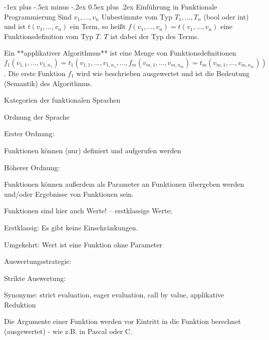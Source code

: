 \documentclass[10pt]{article}
\makeatletter
\renewcommand{\section}{\@startsection{section}{1}{0mm}%
                                {-1ex plus -.5ex minus -.2ex}%
                                {0.5ex plus .2ex}%
                                {\normalfont\large\bfseries}}
\makeatother
\begin{document}
\begin{itemize*}
\section{Einführung in Funktionale Programmierung}
Sind $v_1, ..., v_n$ Unbestimmte vom Typ $T_1, ..., T_n$ (bool oder int) und ist $t(v_1,...,v_n)$ ein Term, so heißt $f(v_1,...,v_n)= t(v_1,...,v_n)$ eine Funktionsdefinition vom Typ $T$. $T$ ist dabei der Typ des Terms.

Ein **applikativer Algorithmus** ist eine Menge von Funktionsdefinitionen $f_1(v_{1,1}, ..., v_{1,n_1}) = t_1(v_{1,1},...,v_{1,n_1},..., f_m(v_{m,1},...,v_{m,n_m}) = t_m(v_{m,1},..., v_{m,n_m}))$. Die erste Funktion $f_1$ wird wie beschrieben ausgewertet und ist die Bedeutung (Semantik) des Algorithmus.

Kategorien der funktionalen Sprachen
\begin{itemize*}
  \item Ordnung der Sprache
  \begin{itemize*}
    \item Erster Ordnung:
    \begin{itemize*}
      \item Funktionen können (nur) definiert und aufgerufen werden
    \end{itemize*}
    \item Höherer Ordnung:
    \begin{itemize*}
      \item Funktionen können außerdem als Parameter an Funktionen übergeben werden und/oder Ergebnisse von Funktionen sein.
      \item Funktionen sind hier auch Werte! -- erstklassige Werte;
      \item Erstklassig: Es gibt keine Einschränkungen.
      \item Umgekehrt: Wert ist eine Funktion ohne Parameter
    \end{itemize*}
  \end{itemize*}
  \item Auswertungsstrategie:
  \begin{itemize*}
    \item Strikte Auswertung:
    \begin{itemize*}
      \item Synonyme: strict evaluation, eager evaluation, call by value, applikative Reduktion
      \item Die Argumente einer Funktion werden vor Eintritt in die Funktion berechnet (ausgewertet) - wie z.B. in Pascal oder C.

\end{itemize*}
\end{itemize*}
\end{itemize*}
\end{itemize*}
\end{document}
